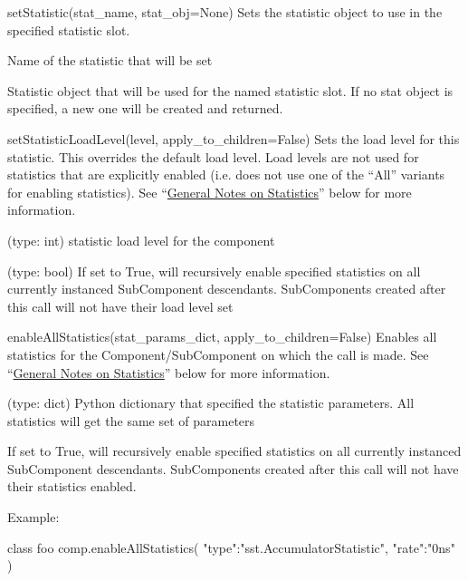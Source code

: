 \begin{functiondoc}{setStatistic(stat_name, stat_obj=None)}
  { Sets the statistic object to use in the specified statistic slot.}

   Name of the statistic that will be set

   Statistic object that will be used for the named
  statistic slot.  If no stat object is specified, a new one will be
  created and returned.

\end{functiondoc}
  

\begin{functiondoc}{setStatisticLoadLevel(level, apply_to_children=False)}
  { Sets the load level for this statistic.  This overrides the
    default load level.  Load levels are not used for statistics that
    are explicitly enabled (i.e. does not use one of the “All”
    variants for enabling statistics).  See
    ``\hyperref[sec:gen-notes-stats]{General Notes on Statistics}''
    below for more information.}

   (type: int) statistic load level for the component

   (type: bool) If set to True, will
  recursively enable specified statistics on all currently instanced
  SubComponent descendants.  SubComponents created after this call
  will not have their load level set

  \noreturn
\end{functiondoc}


\begin{functiondoc}{enableAllStatistics(stat_params_dict, apply_to_children=False)}
  { Enables all statistics for the Component/SubComponent on which the
    call is made.  See ``\hyperref[sec:gen-notes-stats]{General Notes
      on Statistics}'' below for more information.}

   (type: dict) Python dictionary that
  specified the statistic parameters.  All statistics will get the
  same set of parameters

   If set to True, will recursively enable
  specified statistics on all currently instanced SubComponent
  descendants.  SubComponents created after this call will not have
  their statistics enabled.

  \noreturn

  Example:

  \begin{pycodeexample}{}
    class foo
    comp.enableAllStatistics({
        "type":"sst.AccumulatorStatistic",
        "rate":"0ns"
    })
  \end{pycodeexample}
\end{functiondoc}
  
